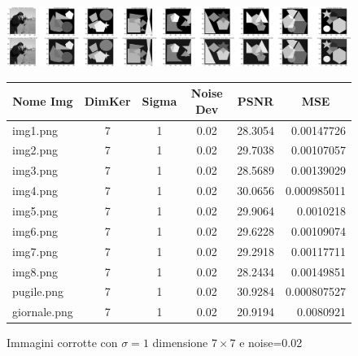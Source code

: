 \begin{figure}[H]
    \centering
    \begin{minipage}[h]{\textwidth}
    \includegraphics[width=\linewidth]{output/tabCorrotte/imgcorr6.png}\label{fig:imgcorrotte6}
    \end{minipage}
    \begin{minipage}[h]{\textwidth}
        \centering
        
        \begin{tabular}{|l c c c c r|}
            \hline
            \multicolumn{1}{|c}{\textbf{Nome Img}} & \multicolumn{1}{|c}{\textbf{DimKer}} & \multicolumn{1}{|c}{\textbf{Sigma}} & \multicolumn{1}{|c}{\textbf{Noise Dev}} & \multicolumn{1}{|c}{\textbf{PSNR}} & \multicolumn{1}{|c|}{\textbf{MSE}} \\ \hline
                img1.png & 7 & 1 & 0.02 & 28.3054 & 0.00147726 \\
                img2.png & 7 & 1 & 0.02 & 29.7038 & 0.00107057 \\
                img3.png & 7 & 1 & 0.02 & 28.5689 & 0.00139029 \\
                img4.png & 7 & 1 & 0.02 & 30.0656 & 0.000985011 \\
                img5.png & 7 & 1 & 0.02 & 29.9064 & 0.0010218 \\                 
                img6.png & 7 & 1 & 0.02 & 29.6228 & 0.00109074 \\ 
                img7.png & 7 & 1 & 0.02 & 29.2918 & 0.00117711 \\
                img8.png & 7 & 1 & 0.02 & 28.2434 & 0.00149851 \\
                pugile.png & 7 & 1 & 0.02 & 30.9284 & 0.000807527 \\
                giornale.png & 7 & 1 & 0.02 & 20.9194 & 0.0080921 \\ \hline
            \end{tabular}\label{tab:tabcorrotte6}
        
        \end{minipage}
    \captionsetup{labelformat=andtable}
    \caption{Immagini corrotte con $\sigma = 1$ dimensione $7 \times 7$ e noise=0.02}
\end{figure}

